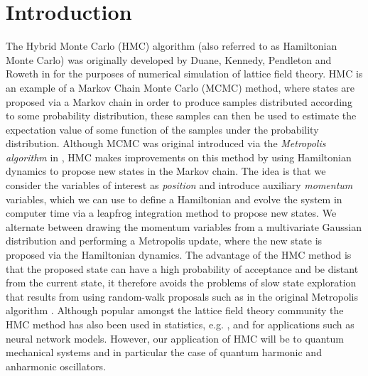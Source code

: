 \documentclass[12pt]{article}
\begin{document}
\section{Introduction}
 The Hybrid Monte Carlo (HMC) algorithm (also referred to as Hamiltonian Monte Carlo) was originally developed by Duane, Kennedy, Pendleton and Roweth in \cite{duane_kennedy_pendleton_roweth_1987} for the purposes of numerical simulation of lattice field theory. HMC is an example of a Markov Chain Monte Carlo (MCMC) method, where states are proposed via a Markov chain in order to produce samples distributed according to some probability distribution, these samples can then be used to estimate the expectation value of some function of the samples under the probability distribution. Although MCMC was original introduced via the \textit{Metropolis algorithm} in \cite{metropolis_rosenbluth_rosenbluth_teller_teller_1953}, HMC makes improvements on this method by using Hamiltonian dynamics to propose new states in the Markov chain. The idea is that we consider the variables of interest as \textit{position} and introduce auxiliary \textit{momentum} variables, which we can use to define a Hamiltonian and evolve the system in computer time via a leapfrog integration method to propose new states. We alternate between drawing the momentum variables from a multivariate Gaussian distribution and performing a Metropolis update, where the new state is proposed via the Hamiltonian dynamics. The advantage of the HMC method is that the proposed state can have a high probability of acceptance and be distant from the current state, it therefore avoids the problems of slow state exploration that results from using random-walk proposals such as in the original Metropolis algorithm \cite{neal_2011}. Although popular amongst the lattice field theory community the HMC method has also been used in statistics, e.g. \cite{neal_1996_a}, \cite{ishwaran_1999} and \cite{schmidt_2009} for applications such as neural network models. However, our application of HMC will be to quantum mechanical systems and in particular the case of quantum harmonic and anharmonic oscillators.
\end{document}
